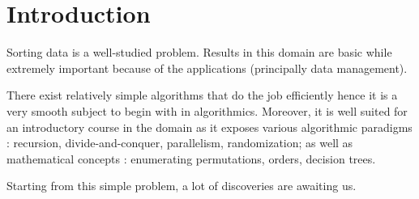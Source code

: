 \section{Introduction}
\label{tree:sorting:intro}

Sorting data is a well-studied problem. Results in this domain are basic while
extremely important because of the applications (principally data management).

There exist relatively simple algorithms that do the job efficiently hence it
is a very smooth subject to begin with in algorithmics. Moreover, it is well
suited for an introductory course in the domain as it exposes various
algorithmic paradigms : recursion, divide-and-conquer, parallelism,
randomization; as well as mathematical concepts : enumerating permutations,
orders, decision trees.

Starting from this simple problem, a lot of discoveries are awaiting us.
